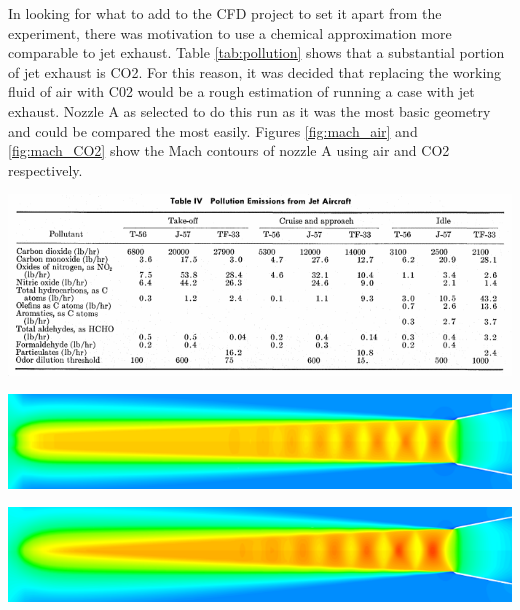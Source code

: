 \documentclass[12pt]{article} %
\begin{document}
In looking for what to add to the CFD project to set it apart from the experiment, there was motivation to use a chemical approximation more comparable to jet exhaust. Table \ref{tab:pollution} shows that a substantial portion of jet exhaust is CO2. For this reason, it was decided that replacing the working fluid of air with C02 would be a rough estimation of running a case with jet exhaust. Nozzle A as selected to do this run as it was the most basic geometry and could be compared the most easily. Figures \ref{fig:mach_air} and \ref{fig:mach_CO2} show the Mach contours of nozzle A using air and CO2 respectively.

\begin{center}
    \includegraphics[width=\linewidth]{JetPollutionTable.png}
    \label{tab:pollution}
\end{center}

\begin{center}
    \includegraphics[width=6in]{Mach_Air.png}
    \label{fig:mach_air}
\end{center}

\begin{center}
    \includegraphics[width=6in]{Mach_CO2.png}
    \label{fig:mach_CO2}
\end{center}
\end{document}
